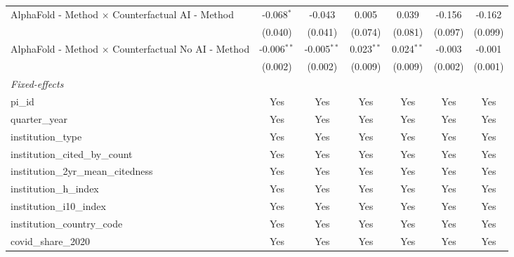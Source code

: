 \begin{tabular}{lcccccc}
   AlphaFold - Method $\times$ Counterfactual AI - Method      & -0.068$^{*}$  & -0.043        & 0.005         & 0.039         & -0.156        & -0.162\\   
                                                               & (0.040)       & (0.041)       & (0.074)       & (0.081)       & (0.097)       & (0.099)\\   
   AlphaFold - Method $\times$ Counterfactual No AI - Method   & -0.006$^{**}$ & -0.005$^{**}$ & 0.023$^{**}$  & 0.024$^{**}$  & -0.003        & -0.001\\   
                                                               & (0.002)       & (0.002)       & (0.009)       & (0.009)       & (0.002)       & (0.001)\\   
   \midrule
   \emph{Fixed-effects}\\
   pi\_id                                                      & Yes           & Yes           & Yes           & Yes           & Yes           & Yes\\  
   quarter\_year                                               & Yes           & Yes           & Yes           & Yes           & Yes           & Yes\\  
   institution\_type                                           & Yes           & Yes           & Yes           & Yes           & Yes           & Yes\\  
   institution\_cited\_by\_count                               & Yes           & Yes           & Yes           & Yes           & Yes           & Yes\\  
   institution\_2yr\_mean\_citedness                           & Yes           & Yes           & Yes           & Yes           & Yes           & Yes\\  
   institution\_h\_index                                       & Yes           & Yes           & Yes           & Yes           & Yes           & Yes\\  
   institution\_i10\_index                                     & Yes           & Yes           & Yes           & Yes           & Yes           & Yes\\  
   institution\_country\_code                                  & Yes           & Yes           & Yes           & Yes           & Yes           & Yes\\  
   covid\_share\_2020                                          & Yes           & Yes           & Yes           & Yes           & Yes           & Yes\\  

\end{tabular}

